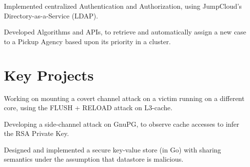 \documentclass[]{deedy-resume-reversed}
\begin{document}
\begin{minipage}[t]{0.60\textwidth}
\begin{tightemize}
	\item Implemented centralized Authentication and Authorization, using JumpCloud’s Directory-as-a-Service (LDAP).
\item Developed Algorithms and APIs, to retrieve and automatically assign a new case to a Pickup Agency based upon its priority in a cluster.
\end{tightemize}
\sectionsep


\section{Key Projects}
\descript{  }
\begin{tightemize}
    \item Working on mounting a covert channel attack on a victim running on a different core, using the FLUSH + RELOAD attack on L3-cache.
    \item Developing a side-channel attack on GnuPG, to observe cache accesses to infer the RSA Private Key.
\end{tightemize}
\sectionsep

\begin{tightemize}
    \item Designed and implemented a secure key-value store (in Go) with sharing semantics under the assumption that datastore is malicious.
\end{tightemize}
\sectionsep


\end{minipage}
\end{document}
